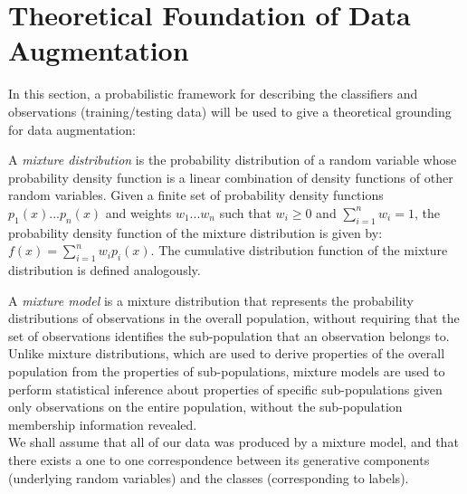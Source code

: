 \documentclass[12pt,twoside,notitlepage,amsart]{report} %
\begin{document}
	
	\section{Theoretical Foundation of Data Augmentation}
	
	In this section, a probabilistic framework for describing the classifiers and observations (training/testing data) \cite{Nigam98} will be used to give a theoretical grounding for data augmentation:
	
	A \emph{mixture distribution} is the probability distribution of a random variable whose probability density function is a linear combination of density functions of other random variables. Given a finite set of probability density functions $p_1(x)...p_n(x)$ and weights $w_1...w_n$ such that $w_i \geq 0$ and $\sum\limits_{i=1}^n w_i = 1$, the probability density function of the mixture distribution is given by: $f(x) = \sum\limits_{i=1}^n w_i p_i(x)$. The cumulative distribution function of the mixture distribution is defined analogously.
	
	A \emph{mixture model} is a mixture distribution that represents the probability distributions of observations in the overall population, without requiring that the set of observations identifies the sub-population that an observation belongs to. Unlike mixture distributions, which are used to derive properties of the overall population from the properties of sub-populations, mixture models are used to perform statistical inference about properties of specific sub-populations given only observations on the entire population, without the sub-population membership information revealed. \\
	
	We shall assume that all of our data was produced by a mixture model, and that there exists a one to one correspondence between its generative components (underlying random variables) and the classes (corresponding to labels). 
	  
\end{document}
